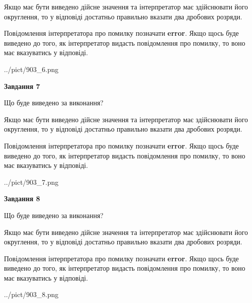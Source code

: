 \documentclass[12pt, ukrainian]{article}
\begin{document}
{\begin {Large}
Якщо має бути виведено дійсне значення та інтерпретатор має здійснювати його округлення, 
то у відповіді достатньо правильно вказати два дробових розряди.

Повідомлення інтерпретатора про помилку позначати \textbf{error}.
Якщо щось буде виведено до того, як інтерпретатор видасть повідомлення про помилку, 
то воно має вказуватись у відповіді. \par

\begin{center}
	{../pict/903_6.png}
\end{center}
\newpage

{\begin {center}\textbf{Завдання 7}\end {center}}\par
Що буде виведено за виконання? \par

Якщо має бути виведено дійсне значення та інтерпретатор має здійснювати його округлення, 
то у відповіді достатньо правильно вказати два дробових розряди.

Повідомлення інтерпретатора про помилку позначати \textbf{error}.
Якщо щось буде виведено до того, як інтерпретатор видасть повідомлення про помилку, 
то воно має вказуватись у відповіді. \par

\begin{center}
	{../pict/903_7.png}
\end{center}
\newpage

{\begin {center}\textbf{Завдання 8}\end {center}}\par
Що буде виведено за виконання? \par

Якщо має бути виведено дійсне значення та інтерпретатор має здійснювати його округлення, 
то у відповіді достатньо правильно вказати два дробових розряди.

Повідомлення інтерпретатора про помилку позначати \textbf{error}.
Якщо щось буде виведено до того, як інтерпретатор видасть повідомлення про помилку, 
то воно має вказуватись у відповіді. \par

\begin{center}
	{../pict/903_8.png}
\end{center}
\newpage


\end{Large}}
\end{document}
